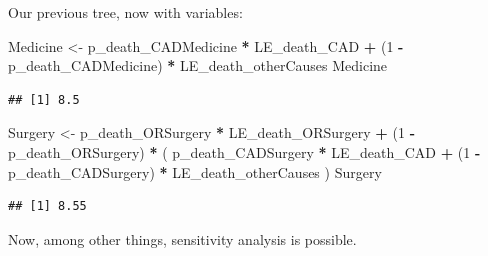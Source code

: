 \documentclass[
]{article}
\newenvironment{Shaded}{\begin{snugshade}}{\end{snugshade}}
\newcommand{\DecValTok}[1]{\textcolor[rgb]{0.00,0.00,0.81}{#1}}
\newcommand{\NormalTok}[1]{#1}
\newcommand{\OtherTok}[1]{\textcolor[rgb]{0.56,0.35,0.01}{#1}}
\newcommand{\SpecialCharTok}[1]{\textcolor[rgb]{0.81,0.36,0.00}{\textbf{#1}}}
\begin{document}
Our previous tree, now with variables:

\begin{Shaded}
\begin{Highlighting}[]
\NormalTok{Medicine }\OtherTok{\textless{}{-}}\NormalTok{     p\_death\_CADMedicine  }\SpecialCharTok{*}\NormalTok{ LE\_death\_CAD }\SpecialCharTok{+} 
\NormalTok{           (}\DecValTok{1} \SpecialCharTok{{-}}\NormalTok{ p\_death\_CADMedicine) }\SpecialCharTok{*}\NormalTok{ LE\_death\_otherCauses}
\NormalTok{Medicine}
\end{Highlighting}
\end{Shaded}

\begin{verbatim}
## [1] 8.5
\end{verbatim}

\begin{Shaded}
\begin{Highlighting}[]
\NormalTok{Surgery  }\OtherTok{\textless{}{-}}\NormalTok{     p\_death\_ORSurgery }\SpecialCharTok{*}\NormalTok{ LE\_death\_ORSurgery }\SpecialCharTok{+} 
\NormalTok{           (}\DecValTok{1} \SpecialCharTok{{-}}\NormalTok{ p\_death\_ORSurgery) }\SpecialCharTok{*}\NormalTok{ (      p\_death\_CADSurgery  }\SpecialCharTok{*}\NormalTok{ LE\_death\_CAD }\SpecialCharTok{+} 
\NormalTok{                                       (}\DecValTok{1} \SpecialCharTok{{-}}\NormalTok{ p\_death\_CADSurgery) }\SpecialCharTok{*}\NormalTok{ LE\_death\_otherCauses}
\NormalTok{                                     )}
\NormalTok{Surgery}
\end{Highlighting}
\end{Shaded}

\begin{verbatim}
## [1] 8.55
\end{verbatim}

Now, among other things, sensitivity analysis is possible.
\end{document}
